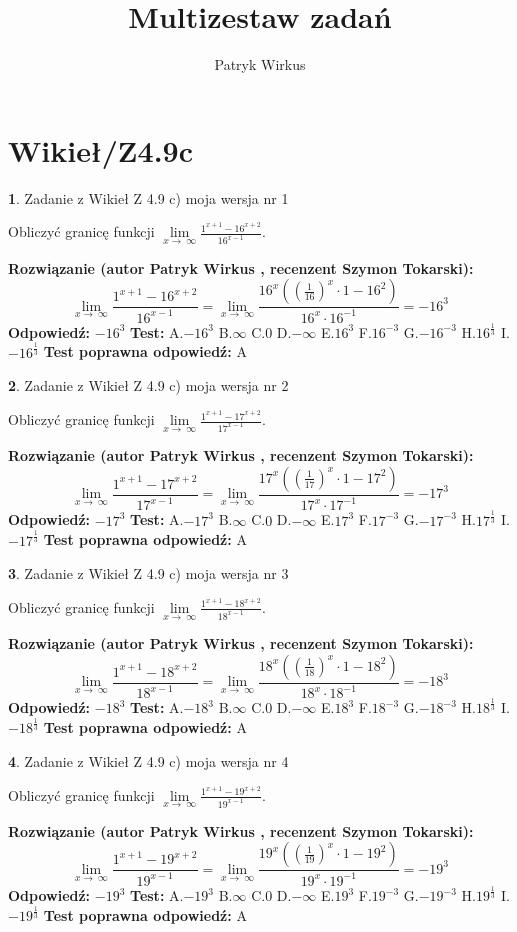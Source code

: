 \documentclass[12pt, a4paper]{article}
\title{Multizestaw zadań}
\author{Patryk Wirkus}
\date{}
\theoremstyle{definition} %
\newtheorem{zad}{}
\newcommand{\kategoria}[1]{\section{#1}}
\newcommand{\zadStart}[1]{\begin{zad}#1\newline}
\newcommand{\zadStop}{\end{zad}}
\newcommand{\rozwStart}[2]{\noindent \textbf{Rozwiązanie (autor #1 , recenzent #2): }\newline}
\newcommand{\rozwStop}{\newline}
\newcommand{\odpStart}{\noindent \textbf{Odpowiedź:}\newline}
\newcommand{\odpStop}{\newline}
\newcommand{\testStart}{\noindent \textbf{Test:}\newline}
\newcommand{\testStop}{\newline}
\newcommand{\kluczStart}{\noindent \textbf{Test poprawna odpowiedź:}\newline}
\newcommand{\kluczStop}{\newline}
\begin{document}
\maketitle

\kategoria{Wikieł/Z4.9c}


\zadStart{Zadanie z Wikieł Z 4.9 c) moja wersja nr 1}


Obliczyć granicę funkcji  $\lim\limits_{x\to\ \infty}\frac{1^{x+1}-16^{x+2}}{16^{x-1}}$.
\zadStop
\rozwStart{Patryk Wirkus}{Szymon Tokarski}
$$\lim\limits_{x\to\ \infty}\frac{1^{x+1}-16^{x+2}}{16^{x-1}}=\lim\limits_{x\to\ \infty}\frac{16^{x}((\frac{1}{16})^{x}\cdot 1 -16^{2})}{16^{x}\cdot 16^{-1}} = -16^{3}$$
\rozwStop
\odpStart
$-16^{3}$
\odpStop
\testStart
A.$-16^{3}$ B.$\infty$ C.$0$ D.$-\infty$ E.$16^{3}$
F.$16^{-3}$ G.$-16^{-3}$
H.$16^{\frac{1}{3}}$
I.$-16^{\frac{1}{3}}$
\testStop
\kluczStart
A
\kluczStop



\zadStart{Zadanie z Wikieł Z 4.9 c) moja wersja nr 2}


Obliczyć granicę funkcji  $\lim\limits_{x\to\ \infty}\frac{1^{x+1}-17^{x+2}}{17^{x-1}}$.
\zadStop
\rozwStart{Patryk Wirkus}{Szymon Tokarski}
$$\lim\limits_{x\to\ \infty}\frac{1^{x+1}-17^{x+2}}{17^{x-1}}=\lim\limits_{x\to\ \infty}\frac{17^{x}((\frac{1}{17})^{x}\cdot 1 -17^{2})}{17^{x}\cdot 17^{-1}} = -17^{3}$$
\rozwStop
\odpStart
$-17^{3}$
\odpStop
\testStart
A.$-17^{3}$ B.$\infty$ C.$0$ D.$-\infty$ E.$17^{3}$
F.$17^{-3}$ G.$-17^{-3}$
H.$17^{\frac{1}{3}}$
I.$-17^{\frac{1}{3}}$
\testStop
\kluczStart
A
\kluczStop



\zadStart{Zadanie z Wikieł Z 4.9 c) moja wersja nr 3}


Obliczyć granicę funkcji  $\lim\limits_{x\to\ \infty}\frac{1^{x+1}-18^{x+2}}{18^{x-1}}$.
\zadStop
\rozwStart{Patryk Wirkus}{Szymon Tokarski}
$$\lim\limits_{x\to\ \infty}\frac{1^{x+1}-18^{x+2}}{18^{x-1}}=\lim\limits_{x\to\ \infty}\frac{18^{x}((\frac{1}{18})^{x}\cdot 1 -18^{2})}{18^{x}\cdot 18^{-1}} = -18^{3}$$
\rozwStop
\odpStart
$-18^{3}$
\odpStop
\testStart
A.$-18^{3}$ B.$\infty$ C.$0$ D.$-\infty$ E.$18^{3}$
F.$18^{-3}$ G.$-18^{-3}$
H.$18^{\frac{1}{3}}$
I.$-18^{\frac{1}{3}}$
\testStop
\kluczStart
A
\kluczStop



\zadStart{Zadanie z Wikieł Z 4.9 c) moja wersja nr 4}


Obliczyć granicę funkcji  $\lim\limits_{x\to\ \infty}\frac{1^{x+1}-19^{x+2}}{19^{x-1}}$.
\zadStop
\rozwStart{Patryk Wirkus}{Szymon Tokarski}
$$\lim\limits_{x\to\ \infty}\frac{1^{x+1}-19^{x+2}}{19^{x-1}}=\lim\limits_{x\to\ \infty}\frac{19^{x}((\frac{1}{19})^{x}\cdot 1 -19^{2})}{19^{x}\cdot 19^{-1}} = -19^{3}$$
\rozwStop
\odpStart
$-19^{3}$
\odpStop
\testStart
A.$-19^{3}$ B.$\infty$ C.$0$ D.$-\infty$ E.$19^{3}$
F.$19^{-3}$ G.$-19^{-3}$
H.$19^{\frac{1}{3}}$
I.$-19^{\frac{1}{3}}$
\testStop
\kluczStart
A
\kluczStop
\end{document}
